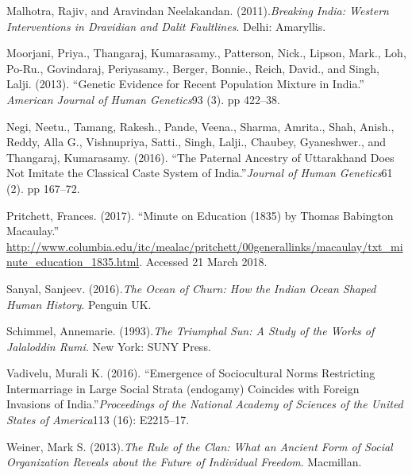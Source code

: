 \begin{thebibliography}{99}
  Malhotra, Rajiv, and Aravindan Neelakandan. (2011).\textit{Breaking India: Western Interventions in Dravidian and Dalit Faultlines}. Delhi: Amaryllis.

  Moorjani, Priya., Thangaraj, Kumarasamy., Patterson, Nick., Lipson, Mark., Loh, Po-Ru., Govindaraj, Periyasamy., Berger, Bonnie., Reich, David., and Singh, Lalji. (2013). “Genetic Evidence for Recent Population Mixture in India.” \textit{American Journal of Human Genetics}93 (3). pp 422–38.

  Negi, Neetu., Tamang, Rakesh., Pande, Veena., Sharma, Amrita., Shah, Anish., Reddy, Alla G., Vishnupriya, Satti., Singh, Lalji., Chaubey, Gyaneshwer., and Thangaraj, Kumarasamy. (2016). “The Paternal Ancestry of Uttarakhand Does Not Imitate the Classical Caste System of India.”\textit{Journal of Human Genetics}61 (2). pp 167–72.

  Pritchett, Frances. (2017). “Minute on Education (1835) by Thomas Babington Macaulay.” \url{http://www.columbia.edu/itc/mealac/pritchett/00generallinks/macaulay/txt_minute_education_1835.html}. Accessed 21 March 2018.

  Sanyal, Sanjeev. (2016).\textit{The Ocean of Churn: How the Indian Ocean Shaped Human History}. Penguin UK.

  Schimmel, Annemarie. (1993).\textit{The Triumphal Sun: A Study of the Works of Jalaloddin Rumi}. New York: SUNY Press.

  Vadivelu, Murali K. (2016). “Emergence of Sociocultural Norms Restricting Intermarriage in Large Social Strata (endogamy) Coincides with Foreign Invasions of India.”\textit{Proceedings of the National Academy of Sciences of the United States of America}113 (16): E2215–17.

  Weiner, Mark S. (2013).\textit{The Rule of the Clan: What an Ancient Form of Social Organization Reveals about the Future of Individual Freedom}. Macmillan.

 \end{thebibliography}

\theendnotes

